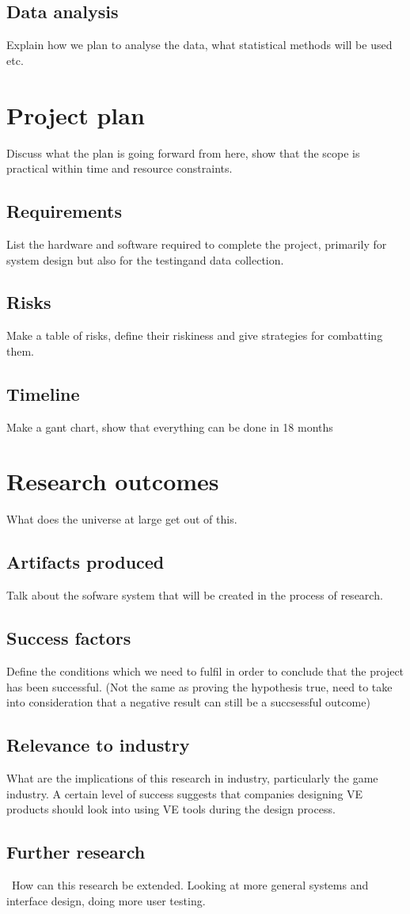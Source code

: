 \documentclass{sig-alternate-05-2015}
\begin{document}
\subsection{Data analysis}
Explain how we plan to analyse the data, what statistical methods will be used etc.
\section{Project plan}
Discuss what the plan is going forward from here, show that the scope is practical within time and resource constraints.
\subsection{Requirements}
List the hardware and software required to complete the project, primarily for system design but also for the testingand data collection.
\subsection{Risks}
Make a table of risks, define their riskiness and give strategies for combatting them.
\subsection{Timeline}
Make a gant chart, show that everything can be done in 18 months
\section{Research outcomes}
What does the universe at large get out of this.
\subsection{Artifacts produced}
Talk about the sofware system that will be created in the process of research.
\subsection{Success factors}
Define the conditions which we need to fulfil in order to conclude that the project has been successful. (Not the same as proving the hypothesis true, need to take into consideration that a negative result can still be a succsessful outcome)
\subsection{Relevance to industry}
What are the implications of this research in industry, particularly the game industry. A certain level of success suggests that companies designing VE products should look into using VE tools during the design process.
\subsection{Further research}\
How can this research be extended. Looking at more general systems and interface design, doing more user testing.



\end{document}
